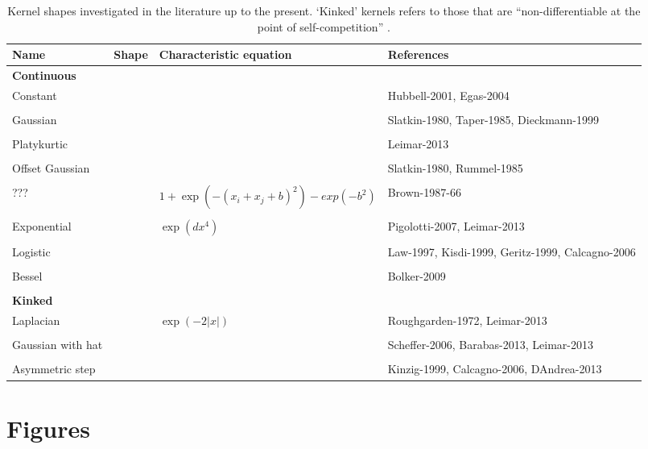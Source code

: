 \documentclass[a4paper,11pt]{article}
\begin{document}
\begin{table}[h]
 \caption{Kernel shapes investigated in the literature up to the present.
`Kinked' kernels refers to those that are ``non-differentiable at the point of
self-competition'' \citep{Barabas-2012}.}
\centering
{\footnotesize
  \begin{tabular}{p{3cm}p{4cm}p{3cm}p{4cm}}
  \hline
  Name & Shape & Characteristic equation & References \\
  \hline
  \multicolumn{4}{l}{\textbf{Continuous}} \\
  Constant & & & Hubbell-2001, Egas-2004 \\ \\
  Gaussian & & & Slatkin-1980, Taper-1985,
  Dieckmann-1999\\ \\
  Platykurtic & & &  Leimar-2013 \\ \\
  Offset Gaussian & & & Slatkin-1980, Rummel-1985\\ \\
  ??? & & $1 + \exp(-(x_i + x_j + b)^2) - exp(-b^2)$ & Brown-1987-66 \\ \\
  Exponential & & $\exp(dx^4)$ &Pigolotti-2007, Leimar-2013\\ \\
  Logistic & & & Law-1997, Kisdi-1999, Geritz-1999, Calcagno-2006\\ \\
  Bessel & & & Bolker-2009\\ \\
 \multicolumn{4}{l}{\textbf{Kinked}} \\
  Laplacian & & $\exp(-2|x|)$ & Roughgarden-1972, Leimar-2013 \\ \\
  Gaussian with hat & & & Scheffer-2006, Barabas-2013, Leimar-2013 \\ \\
  Asymmetric step & & & Kinzig-1999, Calcagno-2006, DAndrea-2013 \\
  \hline
  \end{tabular}
}
\label{tab:shapes}
\end{table}

\clearpage

\section{Figures}
\end{document}
